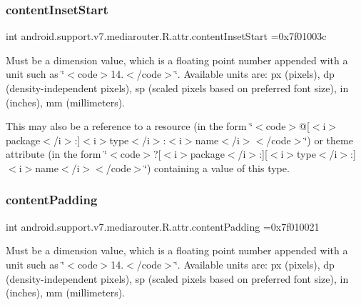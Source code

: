 \subsubsection{\texorpdfstring{content\+Inset\+Start}{contentInsetStart}}
{\footnotesize\ttfamily int android.\+support.\+v7.\+mediarouter.\+R.\+attr.\+content\+Inset\+Start =0x7f01003c\hspace{0.3cm}{\ttfamily [static]}}

Must be a dimension value, which is a floating point number appended with a unit such as \char`\"{}$<$code$>$14.\+5sp$<$/code$>$\char`\"{}. Available units are\+: px (pixels), dp (density-\/independent pixels), sp (scaled pixels based on preferred font size), in (inches), mm (millimeters). 

This may also be a reference to a resource (in the form \char`\"{}$<$code$>$@\mbox{[}$<$i$>$package$<$/i$>$\+:\mbox{]}$<$i$>$type$<$/i$>$\+:$<$i$>$name$<$/i$>$$<$/code$>$\char`\"{}) or theme attribute (in the form \char`\"{}$<$code$>$?\mbox{[}$<$i$>$package$<$/i$>$\+:\mbox{]}\mbox{[}$<$i$>$type$<$/i$>$\+:\mbox{]}$<$i$>$name$<$/i$>$$<$/code$>$\char`\"{}) containing a value of this type. \mbox{\label{classandroid_1_1support_1_1v7_1_1mediarouter_1_1R_1_1attr_af766688b56306f179e9dcdc4986c471d}} 
\subsubsection{\texorpdfstring{content\+Padding}{contentPadding}}
{\footnotesize\ttfamily int android.\+support.\+v7.\+mediarouter.\+R.\+attr.\+content\+Padding =0x7f010021\hspace{0.3cm}{\ttfamily [static]}}

Must be a dimension value, which is a floating point number appended with a unit such as \char`\"{}$<$code$>$14.\+5sp$<$/code$>$\char`\"{}. Available units are\+: px (pixels), dp (density-\/independent pixels), sp (scaled pixels based on preferred font size), in (inches), mm (millimeters). 

